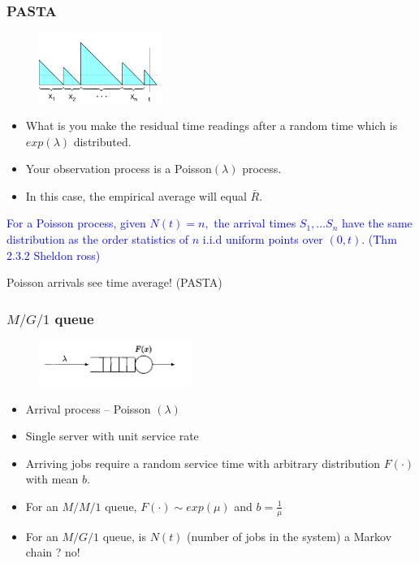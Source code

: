 \documentclass{beamer}
\def \mp {\pause}
\def \mp {}
\newcommand{\ft}[1]{\frametitle{#1}}
\newcommand{\tcb}[1]{\textcolor{blue}{#1}}
\begin{document}
\begin{frame}
\ft{PASTA} 
 \begin{figure}
\includegraphics[width=4cm]{hitch}
\centering
\end{figure}
\begin{itemize}\setlength\itemsep{.4em}
\mp \item What is you make the residual time readings after a random time which is $exp(\lambda)$ distributed.
\mp \item Your observation process is a Poisson$(\lambda)$ process.
\mp\item In this case, the empirical average will equal $\bar{R}$.
\end{itemize}
\mp
\begin{tcolorbox}
\tcb{For a Poisson process, given $N(t) = n,$ the arrival times $S_1,\ldots S_n$ have the same distribution as the order statistics of $n$ i.i.d uniform points over $(0,t)$. (Thm 2.3.2 Sheldon ross)} 
\end{tcolorbox}
\mp \begin{tcolorbox}
Poisson arrivals see time average! (PASTA)     
    \end{tcolorbox}
\end{frame}


\begin{frame}
 \ft{$M/G/1$ queue}
\begin{figure}
\includegraphics[width=5cm]{mgone}
\centering
\end{figure}
\begin{itemize}\setlength\itemsep{.6em}
 \mp \item Arrival process -- Poisson $(\lambda)$
 \mp \item Single server with unit service rate
 \mp \item Arriving jobs require a random service time with arbitrary distribution $F(\cdot)$ with mean $b$.
\mp \item For an $M/M/1$ queue, $F(\cdot) \sim exp(\mu)$ and $b = \frac{1}{\mu}$ 
\mp\item For an $M/G/1$ queue, is $N(t)$ (number of jobs in the system) a Markov chain ? \mp no!
\end{itemize}
\end{frame}
\end{document}
